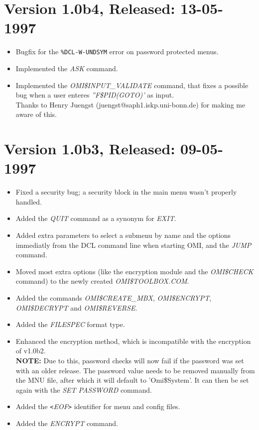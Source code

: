 \documentclass[a4paper]{book}
\newcommand{\lt}{\texttt{<}}
\newcommand{\gt}{\texttt{>}}
\begin{document}
\section*{Version 1.0b4, Released: 13-05-1997}

\begin{itemize}
\item Bugfix for the \texttt{\%DCL-W-UNDSYM} error on password protected menus.
\item Implemented the \textsl{ASK} command.
\item Implemented the \textsl{OMI{\$}INPUT{\_}VALIDATE} command, that fixes a possible bug when a user enteres \textsl{''F{\$}PID(GOTO)'} as input.\\
Thanks to Henry Juengst (juengst@saph1.iskp.uni-bonn.de) for making me aware of this.
\end{itemize}

\section*{Version 1.0b3, Released: 09-05-1997}

\begin{itemize}
\item Fixed a security bug; a security block in the main menu wasn't properly handled.
\item Added the \textsl{QUIT} command as a synonym for \textsl{EXIT}.
\item Added extra parameters to select a submenu by name and the options immediatly from the DCL command line when starting OMI, and the \textsl{JUMP} command.
\item Moved most extra options (like the encryption module and the \textsl{OMI{\$}CHECK} command) to the newly created \textsl{OMI{\$}TOOLBOX.COM}.
\item Added the commands \textsl{OMI{\$}CREATE{\_}MBX}, \textsl{OMI{\$}ENCRYPT}, \textsl{OMI{\$}DECRYPT} and \textsl{OMI{\$}REVERSE}.
\item Added the \textsl{FILESPEC} format type.
\item Enhanced the encryption method, which is incompatible with the encryption of v1.0b2.\\
\textbf{NOTE:} Due to this, password checks will now fail if the password was set with an older release. The password value needs to be removed manually from the MNU file, after which it will default to 'Omi{\$}System'. It can then be set again with the \textsl{SET PASSWORD} command.
\item Added the \textsl{\lt EOF\gt} identifier for menu and config files.
\item Added the \textsl{ENCRYPT} command.
\end{itemize}
\end{document}
